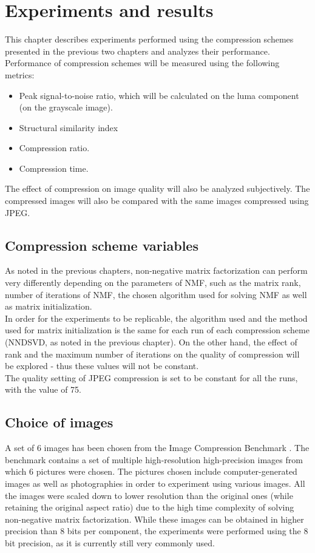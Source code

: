 \documentclass[thesis=M,english]{FITthesis}[2012/10/20]
\begin{document}
\chapter{Experiments and results}
\label{ch:tests}
This chapter describes experiments performed using the compression schemes
presented in the previous two chapters and analyzes their performance. Performance of
compression schemes will be measured using the following metrics:
\begin{itemize}
  \item Peak signal-to-noise ratio, which will be calculated on the luma component
  (on the grayscale image).
  \item Structural similarity index
  \item Compression ratio.
  \item Compression time.
\end{itemize}
The effect of compression on image quality will also be analyzed subjectively.
The compressed images will also be compared with the same images compressed using
JPEG.


\section{Compression scheme variables}
As noted in the previous chapters, non-negative matrix factorization can perform
very differently depending on the parameters of NMF, such as the matrix rank,
number of iterations of NMF, the chosen algorithm used for solving NMF as well
as matrix initialization.
\\

In order for the experiments to be replicable, the algorithm used and the
method used for matrix initialization is the same for each run of each
compression scheme (NNDSVD, as noted in the previous chapter). On the other hand,
the effect of rank and the maximum number of iterations on the quality of compression
will be explored - thus these values will not be constant.
\\

The quality setting of JPEG compression is set to be constant for all the runs, with the value
of 75.


\section{Choice of images}
A set of 6 images has been chosen from the Image Compression Benchmark \cite{imgcomprbenchmark}.
The benchmark contains a set of multiple high-resolution high-precision images from which 6
pictures were chosen. The pictures chosen include computer-generated images as well as photographies
in order to experiment using various images. All the images were scaled down to lower resolution than
the original ones (while retaining the original aspect ratio) due to the high time complexity
of solving non-negative matrix factorization. While these images can be obtained in higher
precision than 8 bits per component, the experiments were performed using the 8 bit precision,
as it is currently still very commonly used.
\\
\end{document}

